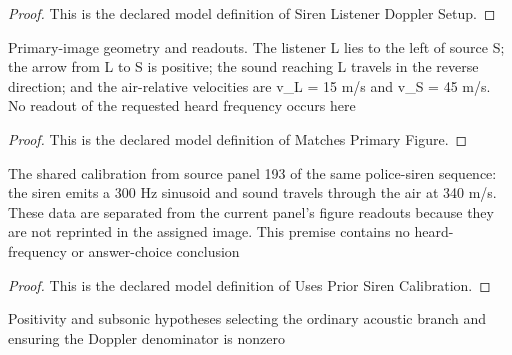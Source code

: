 \begin{proof}
  This is the declared model definition of Siren Listener Doppler Setup.
\end{proof}
\begin{definition}
  \label{def:physics:phyx-mini-0196:phyxminiproblems-problemphyxmini0196-matchesprimaryfigure}
  Primary-image geometry and readouts. The listener L lies to the left of source S; the arrow from L to S is positive; the sound reaching L travels in the reverse direction; and the air-relative velocities are v\_L = 15 m/s and v\_S = 45 m/s. No readout of the requested heard frequency occurs here
\end{definition}
\begin{proof}
  This is the declared model definition of Matches Primary Figure.
\end{proof}
\begin{definition}
  \label{def:physics:phyx-mini-0196:phyxminiproblems-problemphyxmini0196-usespriorsirencalibration}
  The shared calibration from source panel 193 of the same police-siren sequence: the siren emits a 300 Hz sinusoid and sound travels through the air at 340 m/s. These data are separated from the current panel's figure readouts because they are not reprinted in the assigned image. This premise contains no heard-frequency or answer-choice conclusion
\end{definition}
\begin{proof}
  This is the declared model definition of Uses Prior Siren Calibration.
\end{proof}
\begin{definition}
  \label{def:physics:phyx-mini-0196:phyxminiproblems-problemphyxmini0196-hassubsonicphysicalparameters}
  Positivity and subsonic hypotheses selecting the ordinary acoustic branch and ensuring the Doppler denominator is nonzero
\end{definition}
